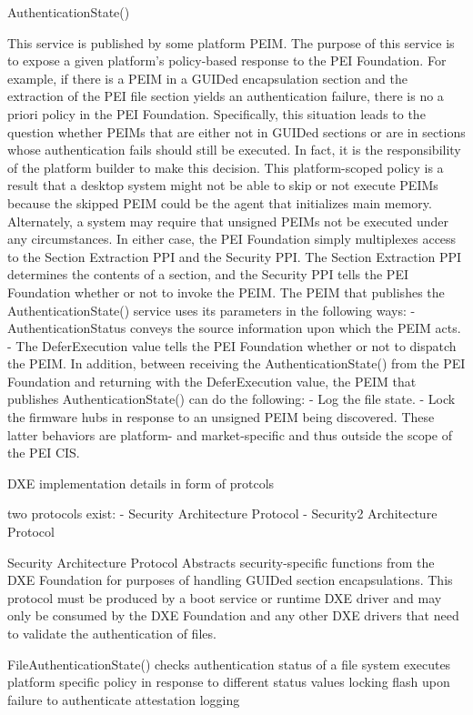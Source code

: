 AuthenticationState()

This service is published by some platform PEIM. The purpose of this service is to expose a given platform's policy-based response to the PEI Foundation. For example, if there is a PEIM in a GUIDed encapsulation section and the extraction of the PEI file section yields an authentication failure, there is no a priori policy in the PEI Foundation. Specifically, this situation leads to the question whether PEIMs that are either not in GUIDed sections or are in sections whose authentication fails should still be executed. In fact, it is the responsibility of the platform builder to make this decision. This platform-scoped policy is a result that a desktop system might not be able to skip or not execute PEIMs because the skipped PEIM could be the agent that initializes main memory. Alternately, a system may require that unsigned PEIMs not be executed under any circumstances. In either case, the PEI Foundation simply multiplexes access to the Section Extraction PPI and the Security PPI. The Section Extraction PPI determines the contents of a section, and the Security PPI tells the PEI Foundation whether or not to invoke the PEIM. The PEIM that publishes the AuthenticationState() service uses its parameters in the following ways:
- AuthenticationStatus conveys the source information upon which the PEIM acts.
- The DeferExecution value tells the PEI Foundation whether or not to dispatch the PEIM. In addition, between receiving the AuthenticationState() from the PEI Foundation and returning with the DeferExecution value, the PEIM that publishes AuthenticationState() can do the following:
- Log the file state.
- Lock the firmware hubs in response to an unsigned PEIM being discovered.
These latter behaviors are platform- and market-specific and thus outside the scope of the PEI CIS.

DXE implementation details in form of protcols

two protocols exist:
- Security Architecture Protocol
- Security2 Architecture Protocol

Security Architecture Protocol
Abstracts security-specific functions from the DXE Foundation for purposes of handling GUIDed
section encapsulations. This protocol must be produced by a boot service or runtime DXE driver
and may only be consumed by the DXE Foundation and any other DXE drivers that need to validate
the authentication of files.

FileAuthenticationState()
checks authentication status of a file
system executes platform specific policy in response to different status values
locking flash upon failure to authenticate
attestation logging


